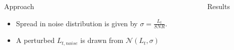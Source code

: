 \documentclass[final]{beamer}
\newlength{\sepwid}
\newlength{\onecolwid}
\newlength{\twocolwid}
\begin{document}
\begin{frame}[t]
\begin{columns}[t]
\begin{column}{\onecolwid}
\begin{block}{Approach}
\begin{itemize}
\begin{figure}
\end{figure}
\item Spread in noise distribution is given by $\sigma = \frac{L_t}{SNR}$.
\item A perturbed $L_{t,noise}$ is drawn from $\mathcal{N}(L_t, \sigma)$
\end{itemize}
\end{block}



\end{column} %


\begin{column}{\twocolwid} %
\begin{block}{Results}

\begin{columns}[t,totalwidth=\twocolwid] %
\begin{column}{\onecolwid}\vspace{-.6in} 


\end{column}
\end{columns}
\end{block}
\end{column}
\end{columns}
\end{frame}
\end{document}
